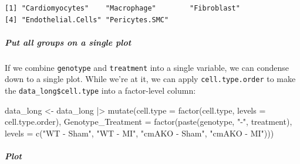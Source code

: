 \documentclass[
  letterpaper,
  DIV=11,
  numbers=noendperiod]{scrreprt}
\let\oldsubparagraph\subparagraph
\renewcommand{\subparagraph}[1]{\oldsubparagraph{#1}\mbox{}}
\newenvironment{Shaded}{\begin{snugshade}}{\end{snugshade}}
\newcommand{\AttributeTok}[1]{\textcolor[rgb]{0.40,0.45,0.13}{#1}}
\newcommand{\FunctionTok}[1]{\textcolor[rgb]{0.28,0.35,0.67}{#1}}
\newcommand{\NormalTok}[1]{\textcolor[rgb]{0.00,0.23,0.31}{#1}}
\newcommand{\OtherTok}[1]{\textcolor[rgb]{0.00,0.23,0.31}{#1}}
\newcommand{\SpecialCharTok}[1]{\textcolor[rgb]{0.37,0.37,0.37}{#1}}
\newcommand{\StringTok}[1]{\textcolor[rgb]{0.13,0.47,0.30}{#1}}
\begin{document}
\begin{verbatim}
[1] "Cardiomyocytes"    "Macrophage"        "Fibroblast"       
[4] "Endothelial.Cells" "Pericytes.SMC"    
\end{verbatim}

\subparagraph{Put all groups on a single
plot}\label{put-all-groups-on-a-single-plot}

If we combine \texttt{genotype} and \texttt{treatment} into a single
variable, we can condense down to a single plot. While we're at it, we
can apply \texttt{cell.type.order} to make the
\texttt{data\_long\$cell.type} into a factor-level column:

\begin{Shaded}
\begin{Highlighting}[]
\NormalTok{data\_long }\OtherTok{\textless{}{-}}\NormalTok{ data\_long }\SpecialCharTok{|\textgreater{}} 
  \FunctionTok{mutate}\NormalTok{(}\AttributeTok{cell.type =} \FunctionTok{factor}\NormalTok{(cell.type, }\AttributeTok{levels =}\NormalTok{ cell.type.order),}
         \AttributeTok{Genotype\_Treatment =} \FunctionTok{factor}\NormalTok{(}\FunctionTok{paste}\NormalTok{(genotype, }\StringTok{"{-}"}\NormalTok{, treatment), }\AttributeTok{levels =} \FunctionTok{c}\NormalTok{(}\StringTok{"WT {-} Sham"}\NormalTok{, }\StringTok{"WT {-} MI"}\NormalTok{, }\StringTok{"cmAKO {-} Sham"}\NormalTok{, }\StringTok{"cmAKO {-} MI"}\NormalTok{)))}
\end{Highlighting}
\end{Shaded}

\subparagraph{Plot}\label{plot}
\end{document}

